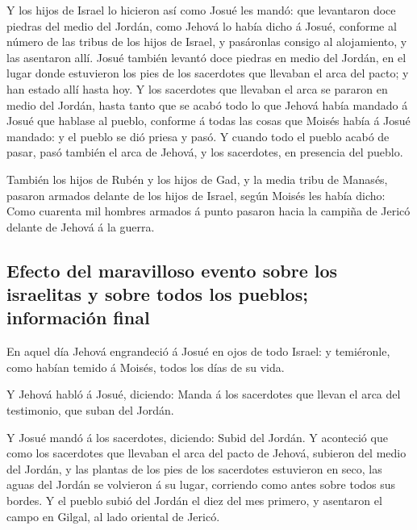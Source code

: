  Y los hijos de Israel lo hicieron así como Josué les mandó:
que levantaron doce piedras del medio del Jordán, como Jehová lo había
dicho á Josué, conforme al número de las tribus de los hijos de Israel,
y pasáronlas consigo al alojamiento, y las asentaron allí. 
Josué también levantó doce piedras en medio del Jordán, en el lugar
donde estuvieron los pies de los sacerdotes que llevaban el arca del
pacto; y han estado allí hasta hoy.  Y los sacerdotes que
llevaban el arca se pararon en medio del Jordán, hasta tanto que se
acabó todo lo que Jehová había mandado á Josué que hablase al pueblo,
conforme á todas las cosas que Moisés había á Josué mandado: y el pueblo
se dió priesa y pasó.  Y cuando todo el pueblo acabó de
pasar, pasó también el arca de Jehová, y los sacerdotes, en presencia
del pueblo.

 También los hijos de Rubén y los hijos de Gad, y la media
tribu de Manasés, pasaron armados delante de los hijos de Israel, según
Moisés les había dicho:  Como cuarenta mil hombres armados
á punto pasaron hacia la campiña de Jericó delante de Jehová á la
guerra.

\hypertarget{efecto-del-maravilloso-evento-sobre-los-israelitas-y-sobre-todos-los-pueblos-informaciuxf3n-final}{%
\subsection{Efecto del maravilloso evento sobre los israelitas y sobre
todos los pueblos; información
final}\label{efecto-del-maravilloso-evento-sobre-los-israelitas-y-sobre-todos-los-pueblos-informaciuxf3n-final}}

 En aquel día Jehová engrandeció á Josué en ojos de todo
Israel: y temiéronle, como habían temido á Moisés, todos los días de su
vida.

 Y Jehová habló á Josué, diciendo:  Manda á
los sacerdotes que llevan el arca del testimonio, que suban del Jordán.

 Y Josué mandó á los sacerdotes, diciendo: Subid del
Jordán.  Y aconteció que como los sacerdotes que llevaban
el arca del pacto de Jehová, subieron del medio del Jordán, y las
plantas de los pies de los sacerdotes estuvieron en seco, las aguas del
Jordán se volvieron á su lugar, corriendo como antes sobre todos sus
bordes.  Y el pueblo subió del Jordán el diez del mes
primero, y asentaron el campo en Gilgal, al lado oriental de Jericó.

